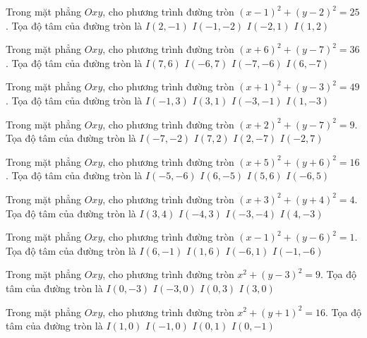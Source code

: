 \begin{ex}
Trong mặt phẳng $Oxy$, cho phương trình đường tròn $(x -1)^2   + (y -2)^2 = 25$. Tọa độ tâm của đường tròn là
\choice
{ $I(2, -1)$ }
{ $I(-1, -2)$ }
{ $I(-2, 1)$ }
{ \True $I(1, 2)$ }
\end{ex}

\begin{ex}
Trong mặt phẳng $Oxy$, cho phương trình đường tròn $(x + 6)^2  + (y -7)^2 = 36$. Tọa độ tâm của đường tròn là
\choice
{ $I(7, 6)$ }
{ \True $I(-6, 7)$ }
{ $I(-7, -6)$ }
{ $I(6, -7)$ }
\end{ex}

\begin{ex}
Trong mặt phẳng $Oxy$, cho phương trình đường tròn $(x + 1)^2  + (y -3)^2 = 49$. Tọa độ tâm của đường tròn là
\choice
{ \True $I(-1, 3)$ }
{ $I(3, 1)$ }
{ $I(-3, -1)$ }
{ $I(1, -3)$ }
\end{ex}

\begin{ex}
Trong mặt phẳng $Oxy$, cho phương trình đường tròn $(x + 2)^2  + (y -7)^2 = 9$. Tọa độ tâm của đường tròn là
\choice
{ $I(-7, -2)$ }
{ $I(7, 2)$ }
{ $I(2, -7)$ }
{ \True $I(-2, 7)$ }
\end{ex}

\begin{ex}
Trong mặt phẳng $Oxy$, cho phương trình đường tròn $(x + 5)^2  + (y + 6)^2 = 16$. Tọa độ tâm của đường tròn là
\choice
{ \True $I(-5, -6)$ }
{ $I(6, -5)$ }
{ $I(5, 6)$ }
{ $I(-6, 5)$ }
\end{ex}

\begin{ex}
Trong mặt phẳng $Oxy$, cho phương trình đường tròn $(x + 3)^2  + (y + 4)^2 = 4$. Tọa độ tâm của đường tròn là
\choice
{ $I(3, 4)$ }
{ $I(-4, 3)$ }
{ \True $I(-3, -4)$ }
{ $I(4, -3)$ }
\end{ex}

\begin{ex}
Trong mặt phẳng $Oxy$, cho phương trình đường tròn $(x -1)^2   + (y -6)^2 = 1$. Tọa độ tâm của đường tròn là
\choice
{ $I(6, -1)$ }
{ \True $I(1, 6)$ }
{ $I(-6, 1)$ }
{ $I(-1, -6)$ }
\end{ex}

\begin{ex}
Trong mặt phẳng $Oxy$, cho phương trình đường tròn $x^2 + (y -3)^2 = 9$. Tọa độ tâm của đường tròn là
\choice
{ $I(0, -3)$ }
{ $I(-3, 0)$ }
{ \True $I(0, 3)$ }
{ $I(3, 0)$ }
\end{ex}

\begin{ex}
Trong mặt phẳng $Oxy$, cho phương trình đường tròn $x^2 + (y + 1)^2 = 16$. Tọa độ tâm của đường tròn là
\choice
{ $I(1, 0)$ }
{ $I(-1, 0)$ }
{ $I(0, 1)$ }
{ \True $I(0, -1)$ }
\end{ex}

